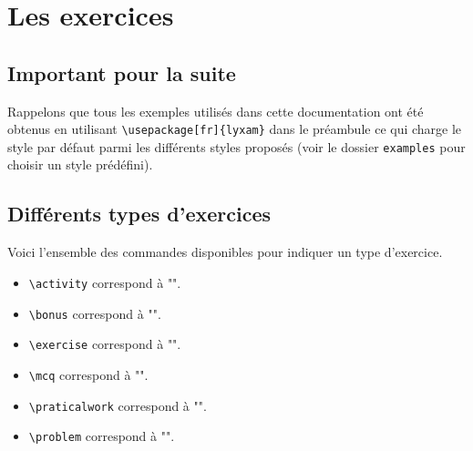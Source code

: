 \documentclass[12pt,a4paper]{scrartcl}
\begin{document}
\newcommand\exosoptionsdescription{
Toutes les options données ci-dessous sont facultatives. Attention car avec les versions simplement étoilées il faut utiliser \texttt{id},
tandis qu'avec les versions doublement étoilées on doit se servir de l'option \texttt{title}.
}

\newcommand\exosoptions{
\IDkey{pts} le nombre de points avec le cas particulier de $0$ qui demande d'afficher "Non noté".

\IDkey{time} la durée de l'exercice.

\IDkey{id} un texte de votre choix pour remplacer le numéro (ceci a pour effet de bloquer temporairement la numérotation).

\IDkey{title} un titre.

\IDkey{about} une petite indication liée à l'exercice (comme par exemple qu'il ne s'adresse qu'aux élèves motivés).

\IDkey{src} la source utilisée pour confectionner l'exercice.
}


\section{Les exercices}

    \subsection{Important pour la suite}

Rappelons que tous les exemples utilisés dans cette documentation ont été obtenus en utilisant \verb+\usepackage[fr]{lyxam}+ dans le préambule ce qui charge le style par défaut parmi les différents styles proposés (voir le dossier \verb+examples+ pour choisir un style prédéfini).


    \subsection{Différents types d'exercices}

Voici l'ensemble des commandes disponibles pour indiquer un type d'exercice.

\begin{itemize}
\makeatletter
    \item \verb+\activity+ correspond à "\lyxam@text@activity{}".
    
    \item \verb+\bonus+ correspond à "\lyxam@text@bonus{}".
    
    \item \verb+\exercise+ correspond à "\lyxam@text@exercise{}".
    
    \item \verb+\mcq+ correspond à "\lyxam@text@mcq{}".
    
    \item \verb+\praticalwork+ correspond à "\lyxam@text@praticalwork{}".
    
    \item \verb+\problem+ correspond à "\lyxam@text@problem{}".
\makeatother
\end{itemize}
\end{document}

